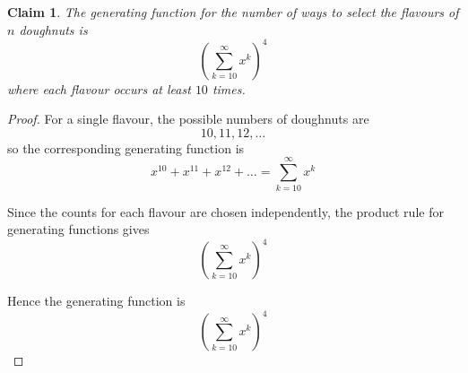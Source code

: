 \documentclass{article}
\newtheorem{claim}{Claim}
\begin{document}
\begin{claim}
    The generating function for the number of ways to select the flavours of $n$ doughnuts is 
    \[
    \left(\sum_{k=10}^{\infty}x^k\right)^4
    \]
    where each flavour occurs at least $10$ times.
\end{claim}

\begin{proof}
    For a single flavour, the possible numbers of doughnuts are 
    \[
    10, 11, 12, \dots
    \]
    so the corresponding generating function is 
    \[
    x^{10} + x^{11} + x^{12} + \dots = \sum_{k=10}^{\infty}x^k
    \]

    \medskip
    
    Since the counts for each flavour are chosen independently, the product rule for
    generating functions gives
    \[
    \left(\sum_{k=10}^{\infty}x^k\right)^4
    \]

    \medskip

    Hence the generating function is
    \[
    \left(\sum_{k=10}^{\infty}x^k\right)^4
    \]
\end{proof}
\end{document}
